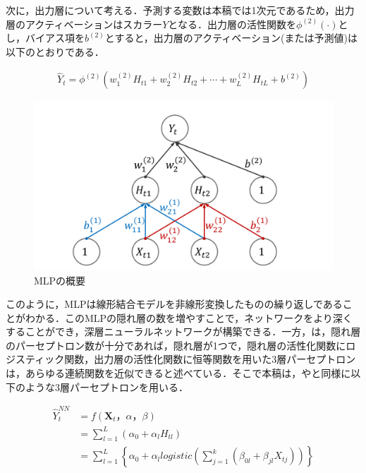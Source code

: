 \documentclass[a4paper，12pt]{jsarticle}
\begin{document}
 次に，出力層について考える．予測する変数は本稿では1次元であるため，出力層のアクティベーションはスカラー$Y$となる．出力層の活性関数を$\phi^{(2)}(\cdot)$とし，バイアス項を$b^{(2)}$とすると，出力層のアクティベーション(または予測値)は以下のとおりである．

\begin{equation}
  \begin{split}
    \hat{Y}_t = \phi^{(2)} \left( w^{(2)}_{1} H_{t1} + w^{(2)}_{2} H_{t2} + \cdots + w^{(2)}_{L} H_{tL} + b^{(2)} \right)
  \end{split}
\end{equation}

\begin{figure}[htbp]
  \centering
  \includegraphics[width=12cm]{./img/_ann_mlp.pdf}
  \caption{MLPの概要}
  \label{fig:mlp}
\end{figure}

このように，MLPは線形結合モデルを非線形変換したものの繰り返しであることがわかる．このMLPの隠れ層の数を増やすことで，ネットワークをより深くすることができ，深層ニューラルネットワークが構築できる．一方，\cite{qi1999nonlinear}は，隠れ層のパーセプトロン数が十分であれば，隠れ層が1つで，隠れ層の活性化関数にロジスティック関数，出力層の活性化関数に恒等関数を用いた3層パーセプトロンは，あらゆる連続関数を近似できると述べている．そこで本稿は，\cite{callen1996neural}や\cite{zhang2004neural}と同様に以下のような3層パーセプトロンを用いる．

\begin{equation}
  \begin{split}
    \hat{Y}_t^{NN} 
    &= f({\bm{X}_t，\alpha，\beta}) \\
    &= \sum^{L}_{l=1} \left(\alpha_0 + \alpha_l H_{tl} \right) \\
    &= \sum^{L}_{l=1} \left\{ \alpha_0 + \alpha_l \textit{logistic} \left(\sum^{k}_{j=1} \left(\beta_{0l} + \beta_{jl} X_{tj} \right) \right) \right\} \\
  \end{split}
\end{equation}
\end{document}
